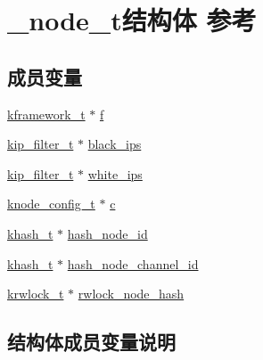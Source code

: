\hypertarget{a00042}{}\section{\+\_\+node\+\_\+t结构体 参考}
\label{a00042}
\subsection*{成员变量}
\begin{DoxyCompactItemize}
\item 
\hyperlink{a00066_a3195a3be35782fc1efb920c811be111d_a3195a3be35782fc1efb920c811be111d}{kframework\+\_\+t} $\ast$ \hyperlink{a00042_a52f222d0826002748dca78f82f22d8bd_a52f222d0826002748dca78f82f22d8bd}{f}
\item 
\hyperlink{a00066_a1c0c604eecd86fc8895cf4bbbba566af_a1c0c604eecd86fc8895cf4bbbba566af}{kip\+\_\+filter\+\_\+t} $\ast$ \hyperlink{a00042_abf96dec5d1ca23c23eee6b8eadc65367_abf96dec5d1ca23c23eee6b8eadc65367}{black\+\_\+ips}
\item 
\hyperlink{a00066_a1c0c604eecd86fc8895cf4bbbba566af_a1c0c604eecd86fc8895cf4bbbba566af}{kip\+\_\+filter\+\_\+t} $\ast$ \hyperlink{a00042_ae16d549727faf60286005d7b2f9bb1ac_ae16d549727faf60286005d7b2f9bb1ac}{white\+\_\+ips}
\item 
\hyperlink{a00066_af1cfaee0eb1c76ebf06076b95cc47ee1_af1cfaee0eb1c76ebf06076b95cc47ee1}{knode\+\_\+config\+\_\+t} $\ast$ \hyperlink{a00042_adf152f01083f7dbfd057db1349bf62d8_adf152f01083f7dbfd057db1349bf62d8}{c}
\item 
\hyperlink{a00066_aa242a9a673d8677076543d5768798f2c_aa242a9a673d8677076543d5768798f2c}{khash\+\_\+t} $\ast$ \hyperlink{a00042_a189a54a34466613b5365e567778800b6_a189a54a34466613b5365e567778800b6}{hash\+\_\+node\+\_\+id}
\item 
\hyperlink{a00066_aa242a9a673d8677076543d5768798f2c_aa242a9a673d8677076543d5768798f2c}{khash\+\_\+t} $\ast$ \hyperlink{a00042_ad36f6157a570df39420b799433b5b1e0_ad36f6157a570df39420b799433b5b1e0}{hash\+\_\+node\+\_\+channel\+\_\+id}
\item 
\hyperlink{a00066_a95d7b2a7caea750fda47edc638788908_a95d7b2a7caea750fda47edc638788908}{krwlock\+\_\+t} $\ast$ \hyperlink{a00042_a0bdfa24aaf39fc465bb6d299df6e96d2_a0bdfa24aaf39fc465bb6d299df6e96d2}{rwlock\+\_\+node\+\_\+hash}
\end{DoxyCompactItemize}


\subsection{结构体成员变量说明}
\hypertarget{a00042_abf96dec5d1ca23c23eee6b8eadc65367_abf96dec5d1ca23c23eee6b8eadc65367}{}
